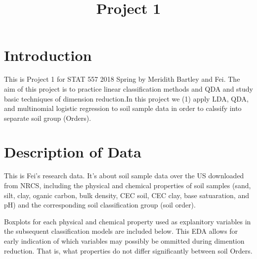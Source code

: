 \documentclass[]{article}
\title{Project 1}
\author{}
\date{}
\begin{document}
\maketitle

\section{Introduction}\label{introduction}

This is Project 1 for STAT 557 2018 Spring by Meridith Bartley and Fei.
The aim of this project is to practice linear classification methods and
QDA and study basic techniques of dimension reduction.In this project we
(1) apply LDA, QDA, and multinomial logistic regression to soil sample
data in order to calssify into separate soil group (Orders).

\section{Description of Data}\label{description-of-data}

This is Fei's research data. It's about soil sample data over the US
downloaded from NRCS, including the physical and chemical properties of
soil samples (sand, silt, clay, oganic carbon, bulk density, CEC soil,
CEC clay, base satuaration, and pH) and the corresponding soil
classification group (soil order).

Boxplots for each physical and chemical property used as explanitory
variables in the subsequent classification models are included below.
This EDA allows for early indication of which variables may possibly be
ommitted during dimention reduction. That is, what properties do not
differ significantly between soil Orders.
\end{document}
